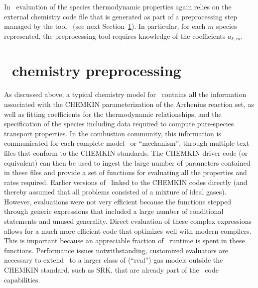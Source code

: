 In \pelelm\ evaluation of the species thermodynamic properties again relies on the external chemistry code file that is generated as part of a preprocessing step managed by the tool \fuego\ (see next Section~\ref{FuegoDescr}). In particular, for each $m$ species represented, the preprocessing tool requires knowledge of the coefficients $a_{k,m}$.



\section{\fuego\ chemistry preprocessing}
\label{FuegoDescr}

As discussed above, a typical chemistry model for \pelelm\ contains all the information associated with the CHEMKIN parameterization of the Arrhenius reaction set, as well as fitting coefficients for the thermodynamic relationships, and the specification of the species including data required to compute pure-species transport properties. In the combustion community, this information is communicated for each complete model --or ``mechanism'', through multiple text files that conform to the CHEMKIN standards. The CHEMKIN driver code (or equivalent) can then be used to ingest the large number of parameters contained in these files and provide a set of functions for evaluating all the properties and rates required.  Earlier versions of \pelelm\ linked to the CHEMKIN codes directly (and thereby assumed that all problems consisted of a mixture of ideal gases).  However, evaluations were not very efficient because the functions stepped through generic expressions that included a large number of conditional statements and unused generality.  Direct evaluation of these complex expressions allows for a much more efficient code that optimizes well with modern compilers. This is important because an appreciable fraction of \pelelm\ runtime is spent in these functions.  Performance issues notwithstanding, customized evaluators are necessary to extend \pelelm\ to a larger class of (``real'') gas models outside the CHEMKIN standard, such as SRK, that are already part of the \pelec\ code capabilities.

